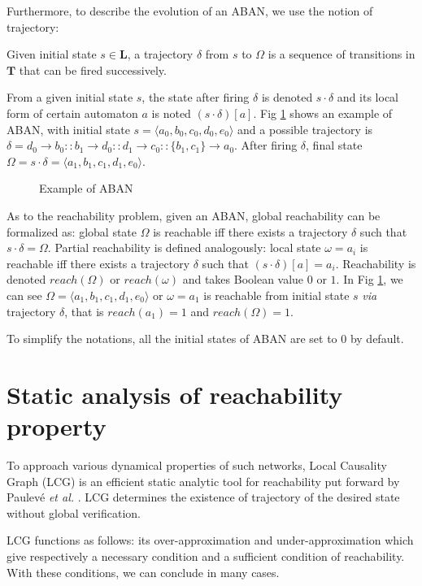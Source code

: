 \documentclass[runningheads]{llncs}
\newcommand{\acm}[3]{#1\rightarrow#2}
\begin{document}
Furthermore, to describe the evolution of an ABAN, we use the notion of trajectory:
\begin{definition}[Trajectory]
Given initial state $s\in \mathbf{L}$, a trajectory $\delta$ from $s$ to $\Omega$ is a sequence of transitions in $\mathbf{T}$ that can be fired successively. %
\end{definition}

From a given initial state $s$, the state after firing $\delta$ is denoted $s\cdot \delta$ and its local form of certain automaton $a$ is noted $(s\cdot \delta)[a]$.
Fig \ref{fig:1} shows an example of ABAN, with initial state $s=\langle a_0,b_0,c_0,d_0,e_0\rangle$ and a possible trajectory is $\delta=\acm{d_0}{b_0}{b_1}::\acm{b_1}{d_0}{d_1}::\acm{d_1}{c_0}{c_1}::\acm{\{b_1,c_1\}}{a_0}{a_1}$. After firing $\delta$, final state $\Omega=s\cdot \delta=\langle a_1,b_1,c_1,d_1,e_0\rangle$.

\begin{figure}[ht]
\centering

\caption{Example of ABAN}\label{fig:1}
\end{figure}	
As to the reachability problem, given an ABAN, global reachability can be formalized as: global state $\Omega$ is reachable iff there exists a trajectory $\delta$ such that $s\cdot \delta=\Omega$. Partial reachability is defined analogously: local state $\omega=a_i$ is reachable iff there exists a trajectory $\delta$ such that $(s\cdot \delta)[a]=a_i$. Reachability is denoted $reach (\Omega)$ or $reach(\omega)$ and takes Boolean value $0$ or $1$. In Fig \ref{fig:1}, we can see $\Omega=\langle a_1,b_1,c_1,d_1,e_0\rangle$ or $\omega=a_1$ is reachable from initial state $s$ \textit{via} trajectory $\delta$, that is $reach(a_1)=1$ and $reach(\Omega)=1$. 

To simplify the notations, all the initial states of ABAN are set to 0 by default.
\section{Static analysis of reachability property}\label{sect:3}
To approach various dynamical properties of such networks, Local Causality Graph (LCG) is an efficient static analytic tool for reachability put forward by Paulev\'e \textit{et al.} \cite{pauleve2011}. LCG determines the existence of trajectory of the desired state without global verification.

LCG functions as follows: its over-approximation and under-approximation which give respectively a necessary condition and a sufficient condition of reachability. With these conditions, we can conclude in many cases.%
\end{document}
